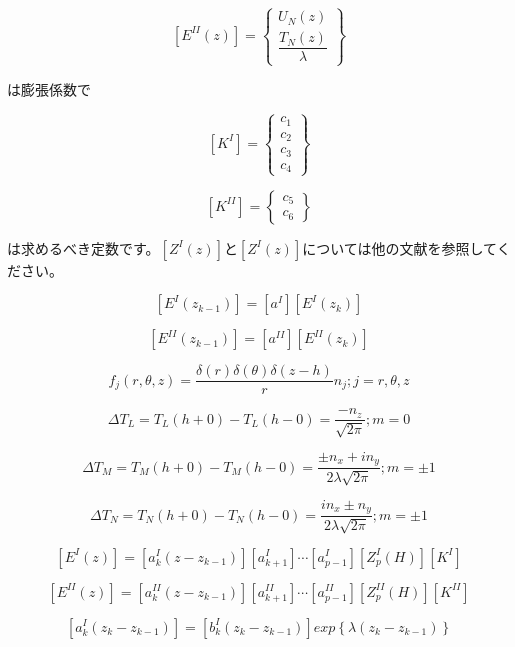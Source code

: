\[\left[E^{II}\left(z\right)\right]=\left\{ \begin{array}{c}
U_{N}\left(z\right)\\
\dfrac{T_{N}\left(z\right)}{\lambda}
\end{array}\right\}\]

は膨張係数で

\[\left[K^{I}\right]=\left\{ \begin{array}{c}
c_{1}\\
c_{2}\\
c_{3}\\
c_{4}
\end{array}\right\}\]

\[\left[K^{II}\right]=\left\{ \begin{array}{c}
c_{5}\\
c_{6}
\end{array}\right\}\]

は求めるべき定数です。$\left[Z^{I}\left(z\right)\right]$と$\left[Z^{I}\left(z\right)\right]$については他の文献を参照してください。

\[\left[E^{I}\left(z_{k-1}\right)\right]=\left[a^{I}\right]\left[E^{I}\left(z_{k}\right)\right]\]

\[\left[E^{II}\left(z_{k-1}\right)\right]=\left[a^{II}\right]\left[E^{II}\left(z_{k}\right)\right]\]

\[f_{j}\left(r,\theta,z\right)=\dfrac{\delta\left(r\right)\delta\left(\theta\right)\delta\left(z-h\right)}{r}n_{j};j=r,\theta,z\]

\[\Delta T_{L}=T_{L}\left(h+0\right)-T_{L}\left(h-0\right)=\dfrac{-n_{z}}{\sqrt{2\pi}};m=0\]

\[\Delta T_{M}=T_{M}\left(h+0\right)-T_{M}\left(h-0\right)=\dfrac{\pm n_{x}+in_{y}}{2\lambda\sqrt{2\pi}};m=\pm1\]

\[\Delta T_{N}=T_{N}\left(h+0\right)-T_{N}\left(h-0\right)=\dfrac{in_{x}\pm n_{y}}{2\lambda\sqrt{2\pi}};m=\pm1\]

\[\left[E^{I}\left(z\right)\right]=\left[a_{k}^{I}\left(z-z_{k-1}\right)\right]\left[a_{k+1}^{I}\right]\cdots\left[a_{p-1}^{I}\right]\left[Z_{p}^{I}\left(H\right)\right]\left[K^{I}\right]\]

\[\left[E^{II}\left(z\right)\right]=\left[a_{k}^{II}\left(z-z_{k-1}\right)\right]\left[a_{k+1}^{II}\right]\cdots\left[a_{p-1}^{II}\right]\left[Z_{p}^{II}\left(H\right)\right]\left[K^{II}\right]\]

\[\left[a_{k}^{I}\left(z_{k}-z_{k-1}\right)\right]=\left[b_{k}^{I}\left(z_{k}-z_{k-1}\right)\right]exp\left\{ \lambda\left(z_{k}-z_{k-1}\right)\right\}\]

